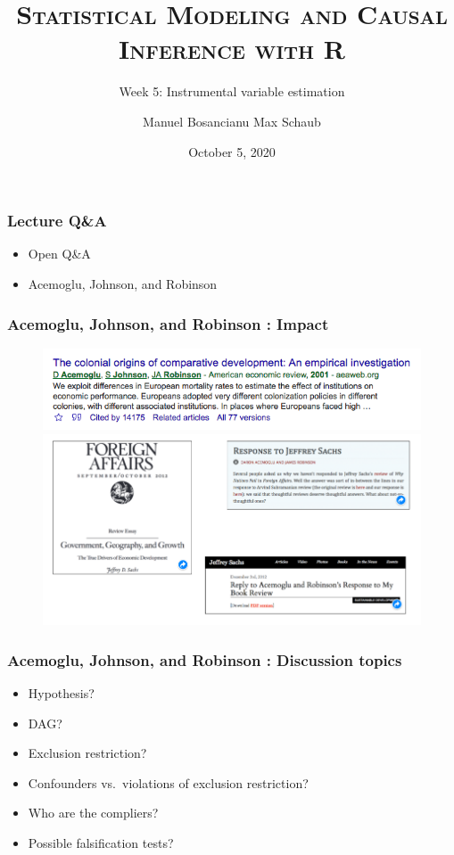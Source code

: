 \documentclass[12pt,english,dvipsnames,aspectratio=169,handout]{beamer}\usepackage[]{graphicx}\usepackage[]{xcolor}
\title{\textsc{Statistical Modeling and Causal Inference with R}}
\subtitle{Week 5: Instrumental variable estimation}
\date{October 5, 2020}
\author{Manuel Bosancianu \hfill Max Schaub}
\institute{Hertie School of Governance}
\begin{document}
\maketitle


\begin{frame}
	\frametitle{Lecture Q\&A}
	\begin{itemize} \large
		\item Open Q\&A 
		\item Acemoglu, Johnson, and Robinson \citeyear{acemoglu_colonial_2001}
	\end{itemize}
\end{frame}


\begin{frame}
	\frametitle{Acemoglu, Johnson, and Robinson \citeyear{acemoglu_colonial_2001}: Impact}
	 \begin{figure} 
    \includegraphics[height=.4\textheight]{../04-figures/05/08-ajr_cites}
    \vfill
    \includegraphics[height=.4\textheight]{../04-figures/05/09-ajr_debate}
    \end{figure}
\end{frame}


\begin{frame}
	\frametitle{Acemoglu, Johnson, and Robinson \citeyear{acemoglu_colonial_2001}: Discussion topics}
	\begin{itemize}
		\item Hypothesis? 
		\item DAG?
		\item Exclusion restriction?
		\item Confounders vs.\ violations of exclusion restriction?
		\item Who are the compliers? 
		\item Possible falsification tests?
	\end{itemize}
\end{frame}
\end{document}
